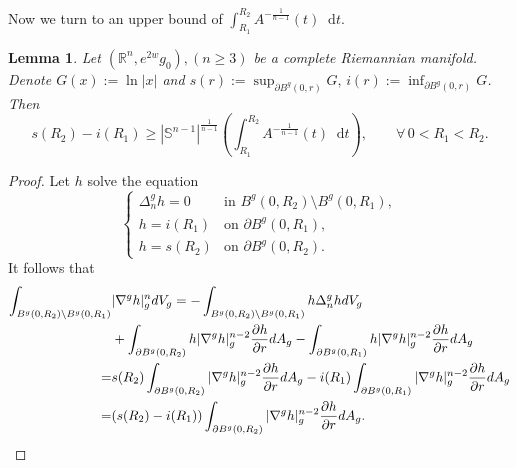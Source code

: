 \documentclass[10pt,a4paper]{amsart}
\newtheorem{lemma}[theorem]{Lemma}
\numberwithin{equation}{section}
\newcommand{\dd}{\mathop{}\!\mathrm{d}}%
\newcommand{\nablag}{\nabla^g} %
\begin{document}
Now we turn to an upper bound of $\int_{R_1}^{R_2} A^{-\frac{1}{n-1}}(t)\dd t$.
\begin{lemma}\label{lemma. upper bound of integral of A(r)}
    Let $(\mathbb{R}^n,e^{2w}g_0),(n\geq 3)$ be a complete Riemannian manifold. Denote $G(x):=\ln |x|$ and $s(r):=\sup_{\partial B^g(0,r)}G,\, i(r):=\inf_{\partial B^g(0,r)}G $. Then
    \[
        s(R_2)-i(R_1)
        \geq        
        |\mathbb{S}^{n-1}|^{\frac{1}{n-1}}
        \left(
        \int_{R_1}^{R_2} A^{-\frac{1}{n-1}}(t)\dd t
        \right),\qquad 
        \forall\, 0<R_1<R_2.
    \]
\end{lemma}
\begin{proof}
    Let $h$ solve the equation 
    \[
        \begin{cases}
            \Delta_n^g h=0  &\text{in } B^g(0,R_2)\setminus B^g(0,R_1),\\
            h=i(R_1) &\text{on } \partial B^g(0,R_1),\\
            h=s(R_2) &\text{on } \partial B^g(0,R_2).
        \end{cases}
    \]
    It follows that
    \begin{align}
        \int_{B^g(0,R_2)\setminus B^g(0,R_1)}&|\nabla^g h|_g^n dV_g\notag
        =-\int_{B^g(0,R_2)\setminus B^g(0,R_1)}h\Delta_n^g h dV_g \\ \notag
        &+\int_{\partial B^g(0,R_2)} h|\nablag h|_g^{n-2}\frac{\partial h}{\partial r} dA_g
        -\int_{\partial B^g(0,R_1)} h|\nablag h|_g^{n-2}\frac{\partial h}{\partial r} dA_g \notag\\
        =&s(R_2)\int_{\partial B^g(0,R_2)} |\nablag h|_g^{n-2}\frac{\partial h}{\partial r} dA_g
        -i(R_1)\int_{\partial B^g(0,R_1)} |\nablag h|_g^{n-2}\frac{\partial h}{\partial r} dA_g \notag\\
        =&(s(R_2)-i(R_1))\int_{\partial B^g(0,R_2)} |\nablag h|_g^{n-2}\frac{\partial h}{\partial r} dA_g. \label{eq. n-Dirichlet energy of h}
    \end{align}


\end{proof}
\end{document}
